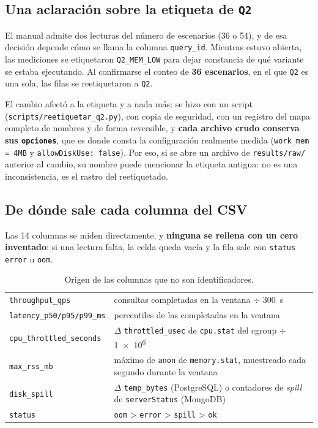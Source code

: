\subsection{Una aclaración sobre la etiqueta de \texttt{Q2}}
\label{sec:reetiquetado}

El manual admite dos lecturas del número de escenarios (36 o 54), y de esa
decisión depende cómo se llama la columna \texttt{query\_id}. Mientras estuvo
abierta, las mediciones se etiquetaron \texttt{Q2\_MEM\_LOW} para dejar
constancia de qué variante se estaba ejecutando. Al confirmarse el conteo de
\textbf{36 escenarios}, en el que \texttt{Q2} es una sola, las filas se
reetiquetaron a \texttt{Q2}.

El cambio afectó a la etiqueta y a nada más: se hizo con un script
(\texttt{scripts/reetiquetar\_q2.py}), con copia de seguridad, con un registro
del mapa completo de nombres y de forma reversible, y \textbf{cada archivo crudo
conserva sus \texttt{opciones}}, que es donde consta la configuración realmente
medida (\texttt{work\_mem = 4MB} y \texttt{allowDiskUse: false}). Por eso, si se
abre un archivo de \texttt{results/raw/} anterior al cambio, su nombre puede
mencionar la etiqueta antigua: no es una inconsistencia, es el rastro del
reetiquetado.

\subsection{De dónde sale cada columna del CSV}

Las 14 columnas se miden directamente, y \textbf{ninguna se rellena con un cero
inventado}: si una lectura falta, la celda queda vacía y la fila sale con
\texttt{status} \texttt{error} u \texttt{oom}.

\begin{table}[htbp]
  \centering
  \caption{Origen de las columnas que no son identificadores.}
  \label{tab:origen-columnas}
  \small
  \begin{tabularx}{\linewidth}{lX}
    \toprule
    \texttt{throughput\_qps} & consultas completadas en la ventana $\div$ 300~s \\
    \texttt{latency\_p50/p95/p99\_ms} & percentiles de las completadas en la ventana \\
    \texttt{cpu\_throttled\_seconds} & $\Delta$ \texttt{throttled\_usec} de
      \texttt{cpu.stat} del cgroup $\div$ \num{1e6} \\
    \texttt{max\_rss\_mb} & máximo de \texttt{anon} de \texttt{memory.stat},
      muestreado cada segundo durante la ventana \\
    \texttt{disk\_spill} & $\Delta$ \texttt{temp\_bytes} (PostgreSQL) o
      contadores de \emph{spill} de \texttt{serverStatus} (MongoDB) \\
    \texttt{status} & \texttt{oom} > \texttt{error} > \texttt{spill} > \texttt{ok} \\
    \bottomrule
  \end{tabularx}
\end{table}

